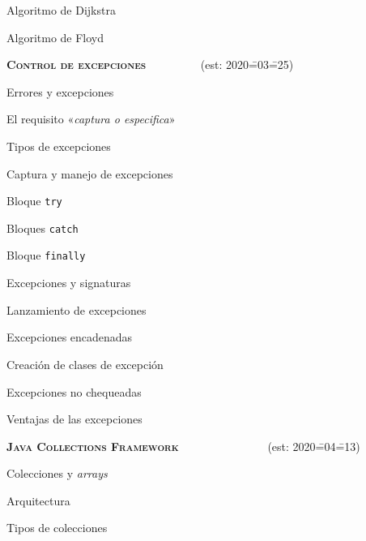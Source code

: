 \begin{longenum}
\begin{longenum}
        \begin{longenum}
            \item Algoritmo de Dijkstra
            \item Algoritmo de Floyd
        \end{longenum}
    \end{longenum}
    \item \textbf{\textsc{Control de excepciones}} \ \ \ \ \ \ \ \ \ (est: 2020\==03\==25)
    \begin{longenum}
        \item Errores y excepciones
        \item El requisito «\textit{captura o especifica}»
        \begin{longenum}
            \item Tipos de excepciones
        \end{longenum}
        \item Captura y manejo de excepciones
        \begin{longenum}
            \item Bloque \texttt{try}
            \item Bloques \texttt{catch}
            \item Bloque \texttt{finally}
        \end{longenum}
        \item Excepciones y signaturas
        \item Lanzamiento de excepciones
        \begin{longenum}
            \item Excepciones encadenadas
            \item Creación de clases de excepción
        \end{longenum}
        \item Excepciones no chequeadas
        \item Ventajas de las excepciones
    \end{longenum}
    \item \textbf{\textsc{Java Collections Framework}} \ \ \ \ \ \ \ \ \ \ \ \ \ \ \ (est: 2020\==04\==13)
    \begin{longenum}
        \item Colecciones y \textit{arrays}
        \item Arquitectura
        \item Tipos de colecciones

\end{longenum}
\end{longenum}
